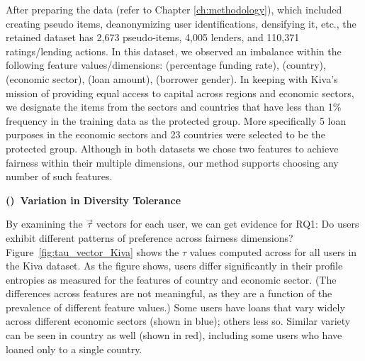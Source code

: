 
After preparing the data (refer to Chapter \ref{ch:methodology}), which included creating pseudo items, deanonymizing user identifications, densifying it, etc., the retained dataset has 2,673 pseudo-items, 4,005 lenders, and 110,371 ratings/lending actions. In this dataset, we observed an imbalance within the following feature values/dimensions: (percentage funding rate), (country), (economic sector), (loan amount), (borrower gender). In keeping with Kiva's mission of providing equal access to capital across regions and economic sectors, we designate the items from the sectors and countries that have less than 1\% frequency in the training data as the protected group. More specifically 5 loan purposes in the economic sectors and 23 countries were selected to be the protected group. Although in both datasets we chose two features to achieve fairness within their multiple dimensions, our method supports choosing any number of such features.

\vspace{0.25cm}
\noindent \textbf{()~Variation in Diversity Tolerance}
\vspace{0.25cm}

By examining the $\vec{\tau}$ vectors for each user, we can get evidence for RQ1: Do users exhibit different patterns of preference across fairness dimensions? Figure~\ref{fig:tau_vector_Kiva} shows the $\tau$ values computed across for all users in the Kiva dataset. As the figure shows, users differ significantly in their profile entropies as measured for the features of country and economic sector. (The differences across features are not meaningful, as they are a function of the prevalence of different feature values.) Some users have loans that vary widely across different economic sectors (shown in blue); others less so. Similar variety can be seen in country as well (shown in red), including some users who have loaned only to a single country.

